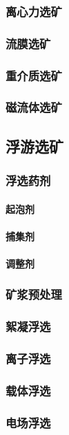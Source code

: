 \documentclass[UTF8]{../../ApplicationUniverse}
\begin{document}
        \subsubsection{离心力选矿}
        \subsubsection{流膜选矿}
        \subsubsection{重介质选矿}
        \subsubsection{磁流体选矿}
    \subsection{浮游选矿}
        \subsubsection{浮选药剂}
            \paragraph{起泡剂}
            \paragraph{捕集剂}
            \paragraph{调整剂}
        \subsubsection{矿浆预处理}
        \subsubsection{絮凝浮选}
        \subsubsection{离子浮选}
        \subsubsection{载体浮选}
        \subsubsection{电场浮选}
\end{document}
